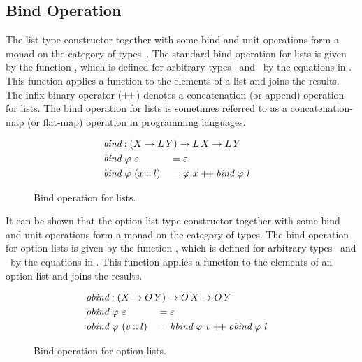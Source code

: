 \subsection{Bind Operation}
\label{sec:bind}

The list type constructor \Lst[(\cdot)] together with some bind and unit operations form a monad on the category of types~\citep{Wad92fp,Wad92monad,Wad95monad}.
The standard bind operation for lists is given by the function \lbind, which is defined for arbitrary types \Val\ and \ValY\ by the equations in .
This function applies a function to the elements of a list and joins the results.
The infix binary operator ($\mathbin{+\mkern-3mu+}$) denotes a concatenation (or append) operation for lists.
The bind operation for lists is sometimes referred to as a concatenation-map (or flat-map) operation in programming languages.

\begin{figure}[H]
  \onehalfspacing
  \begin{alignat*}{2}
    &\mathrlap{\lbind : (\Val \to \Lst[\ValY]) \to \Lst \to \Lst[\ValY]} \\
    &\lbind\ \varphi\ \nil &&= \nil \\
    &\lbind\ \varphi\ (\val\cons\lst)
    &&= \varphi\ \val \concat \lbind\ \varphi\ \lst
  \end{alignat*}
  \caption{Bind operation for lists.}
  \label{fig:bind}
\end{figure}

It can be shown that the option-list type constructor \OLst[(\cdot)] together with some bind and unit operations form a monad on the category of types.
The bind operation for option-lists is given by the function \obind, which is defined for arbitrary types \Val\ and \ValY\ by the equations in .
This function applies a function to the elements of an option-list and joins the results.

\begin{figure}[H] %
  \onehalfspacing
  \begin{alignat*}{2}
    &\mathrlap{\obind : (\Val \to \OLst[\ValY]) \to \OLst \to \OLst[\ValY]} \\
    &\obind\ \varphi\ \nil &&= \nil \\
    &\obind\ \varphi\ (\var\cons\lst)
    &&= \hbind\ \varphi\ \var \concat \obind\ \varphi\ \lst
  \end{alignat*}
  \caption{Bind operation for option-lists.}
  \label{fig:obind}
\end{figure}

